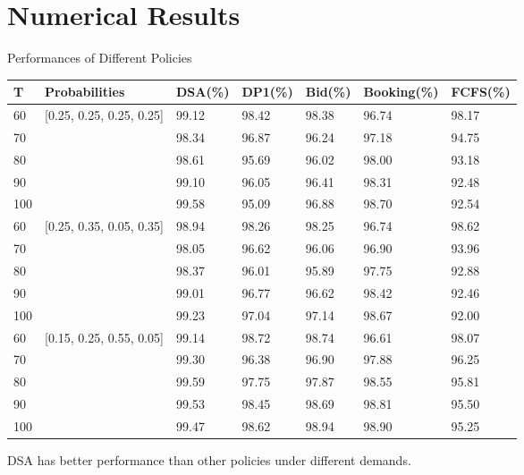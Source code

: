
\section{Numerical Results}
    \frame{\sectionpage}
      
    \begin{frame}{Performances of Different Policies}
        \scriptsize
        \begin{table}[ht]
          \centering
          \begin{tabular}{|l|l|l|l|l|l|l|}
          \hline
           T & Probabilities & DSA(\%) & DP1(\%) & Bid(\%) & Booking(\%) & FCFS(\%) \\
          \hline
          60  & [0.25, 0.25, 0.25, 0.25]  & 99.12 & 98.42 & 98.38 & 96.74 & 98.17 \\
          70  &   & 98.34 & 96.87 & 96.24 & 97.18 & 94.75 \\
          80  &   & 98.61 & 95.69 & 96.02 & 98.00 & 93.18 \\
          90  &   & 99.10 & 96.05 & 96.41 & 98.31 & 92.48 \\
          100 &   & 99.58 & 95.09 & 96.88 & 98.70 & 92.54 \\
          \hline
          60  & [0.25, 0.35, 0.05, 0.35]  & 98.94 & 98.26 & 98.25 & 96.74 & 98.62 \\
          70  &   & 98.05 & 96.62 & 96.06 & 96.90 & 93.96 \\
          80  &   & 98.37 & 96.01 & 95.89 & 97.75 & 92.88 \\
          90  &   & 99.01 & 96.77 & 96.62 & 98.42 & 92.46 \\
          100 &   & 99.23 & 97.04 & 97.14 & 98.67 & 92.00 \\
          \hline
          60  & [0.15, 0.25, 0.55, 0.05]  & 99.14 & 98.72 & 98.74 & 96.61 & 98.07 \\
          70  &   & 99.30 & 96.38 & 96.90 & 97.88 & 96.25 \\
          80  &   & 99.59 & 97.75 & 97.87 & 98.55 & 95.81 \\
          90  &   & 99.53 & 98.45 & 98.69 & 98.81 & 95.50 \\
          100 &   & 99.47 & 98.62 & 98.94 & 98.90 & 95.25 \\
          \hline
          \end{tabular}
        \end{table}
        DSA has better performance than other policies under different demands.

    \end{frame}
      
